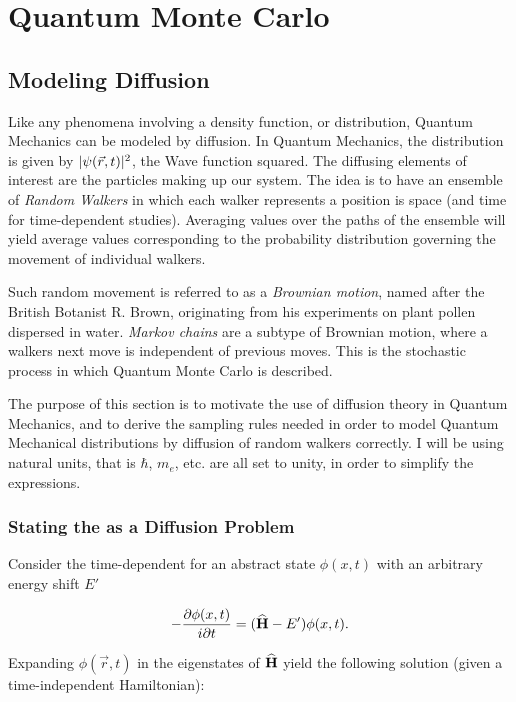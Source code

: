 \chapter{Quantum Monte Carlo}

\section{Modeling Diffusion}

Like any phenomena involving a density function, or distribution, Quantum Mechanics can be modeled by diffusion. In Quantum Mechanics, the distribution is given by $|\psi(\vec r, t)|^2$, the Wave function squared. The diffusing elements of interest are the particles making up our system. The idea is to have an ensemble of \textit{Random Walkers} in which each walker represents a position is space (and time for time-dependent studies). Averaging values over the paths of the ensemble will yield average values corresponding to the probability distribution governing the movement of individual walkers. 

Such random movement is referred to as a \textit{Brownian motion}, named after the British Botanist R. Brown, originating from his experiments on plant pollen dispersed in water. \textit{Markov chains} are a subtype of Brownian motion, where a walkers next move is independent of previous moves. This is the stochastic process in which Quantum Monte Carlo is described.

The purpose of this section is to motivate the use of diffusion theory in Quantum Mechanics, and to derive the sampling rules needed in order to model Quantum Mechanical distributions by diffusion of random walkers correctly. I will be using natural units, that is $\hbar$, $m_e$, etc. are all set to unity, in order to simplify the expressions.

\subsection{Stating the \schrodinger as a Diffusion Problem}

Consider the time-dependent \schrodinger for an abstract state $\phi(x, t)$ with an arbitrary energy shift $E'$

\begin{equation}
 -\frac{\partial \phi(x, t)}{i\partial t} = ({\bf\widehat{H}} - E')\phi(x, t).
\end{equation}

Expanding $\phi(\vec r, t)$ in the eigenstates of ${\bf\widehat{H}}$ yield the following solution (given a time-independent Hamiltonian):

